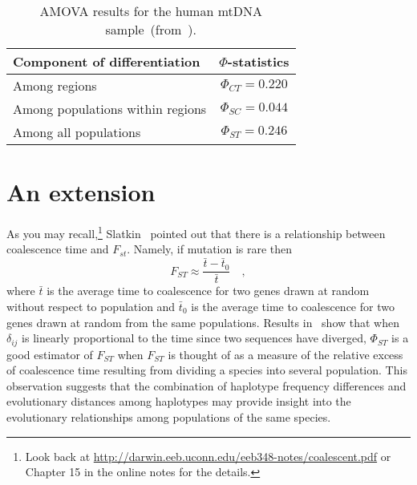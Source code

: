 \begin{table}
\begin{center}
\begin{tabular}{lc}
\hline\hline
Component of differentiation     & $\Phi$-statistics \\
\hline
Among regions                    & $\Phi_{CT} = 0.220$ \\
Among populations within regions & $\Phi_{SC} = 0.044$ \\
Among all populations            & $\Phi_{ST} = 0.246$ \\
\hline
\end{tabular}
\end{center}
\caption{AMOVA results for the human mtDNA
  sample~(from~\cite{Excoffier-etal92}).}\label{table:amova-results}
\end{table}

\section*{An extension}

As you may recall,\footnote{Look back at
  \url{http://darwin.eeb.uconn.edu/eeb348-notes/coalescent.pdf} or
  Chapter 15 in the online notes for the details.}
Slatkin~\cite{Slatkin91-coalescence} pointed out that there is a
relationship between coalescence time and $F_{st}$. Namely, if
mutation is rare then
\[
F_{ST} \approx \frac{\bar t - \bar t_0}{\bar t} \quad ,
\]
where $\bar t$ is the average time to coalescence for two genes drawn
at random without respect to population and $\bar t_0$ is the average
time to coalescence for two genes drawn at random from the same
populations. Results in~\cite{Holsinger-MasonGamer96} show that when
$\delta_{ij}$ is linearly proportional to the time since two sequences
have diverged, $\Phi_{ST}$ is a good estimator of $F_{ST}$ when
$F_{ST}$ is thought of as a measure of the relative excess of
coalescence time resulting from dividing a species into several
population. This observation suggests that the combination of
haplotype frequency differences and evolutionary distances among
haplotypes may provide insight into the evolutionary relationships
among populations of the same species.

